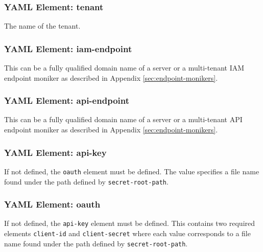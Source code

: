 \subsubsection{YAML Element: tenant}\label{sec:yaml-cxone-tenant}
The name of the \cxone tenant.

\subsubsection{YAML Element: iam-endpoint}\label{sec:yaml-cxone-iam-endpoint}
This can be a fully qualified domain name of a server or a multi-tenant IAM endpoint moniker as described in Appendix \ref{sec:endpoint-monikers}.

\subsubsection{YAML Element: api-endpoint}\label{sec:yaml-cxone-api-endpoint}
This can be a fully qualified domain name of a server or a multi-tenant API endpoint moniker as described in Appendix \ref{sec:endpoint-monikers}.

\subsubsection{YAML Element: api-key}\label{sec:yaml-cxone-api-key}
If not defined, the \texttt{oauth} element must be defined. The value specifies a file name found under the path defined by \texttt{secret-root-path}.

\subsubsection{YAML Element: oauth}\label{sec:yaml-cxone-oauth}
If not defined, the \texttt{api-key} element must be defined. This contains two required elements
\texttt{client-id} and \texttt{client-secret} where each value corresponds to a file name found under the path defined by \texttt{secret-root-path}. 

